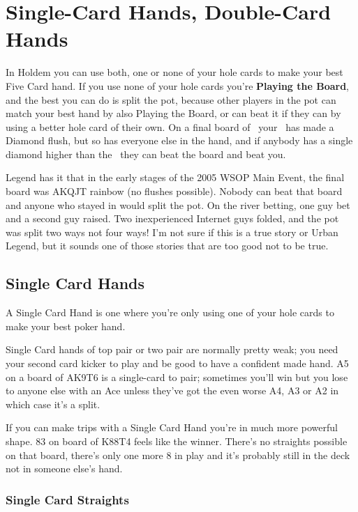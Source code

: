 \chapter{Single-Card Hands, Double-Card Hands}


In Holdem you can use both, one or none of your hole cards to make your
best Five Card hand. If you use none of your hole cards you're
\textbf{Playing the Board}, and the best you can do is split the
pot, because other players in the pot can match your best hand by also
Playing the Board, or can beat it if they can by using a better hole
card of their own. On a final board of \Ad\nined\eigd\Jd\sixd\ your
\Qc\Qs\ has made a Diamond flush, but so has everyone else in the hand,
and if anybody has a single diamond higher than the \sixd\ they can
beat the board and beat you.

Legend has it that in the early stages of the 2005 WSOP Main Event,
the final board was AKQJT rainbow (no flushes possible). Nobody can
beat that board and anyone who stayed in would split the pot. On the
river betting, one guy bet and a second guy raised. Two inexperienced
Internet guys folded, and the pot was split two ways not four ways!
I'm not sure if this is a true story or Urban Legend, but it sounds
one of those stories that are too good not to be true.

\section{Single Card Hands}

A Single Card Hand is one where you're only using one of your hole
cards to make your best poker hand.

Single Card hands of top pair or two pair are normally pretty weak;
you need your second card kicker to play and be good to have a
confident made hand. A5 on a board of AK9T6 is a single-card to pair;
sometimes you'll win but you lose to anyone else with an Ace unless
they've got the even worse A4, A3 or A2 in which case it's a split.

If you can make trips with a Single Card Hand you're in much more
powerful shape. 83 on board of K88T4 feels like the winner. There's no
straights possible on that board, there's only one more 8 in play and
it's probably still in the deck not in someone else's hand.

\subsection{Single Card Straights}

